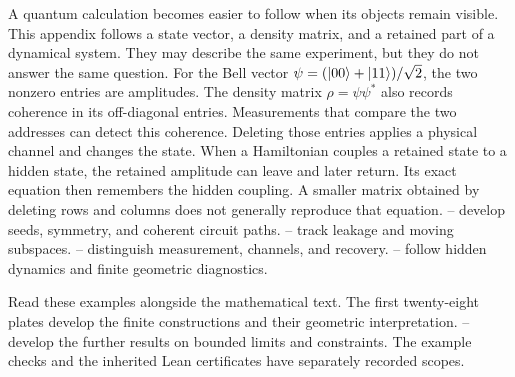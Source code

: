 \begingroup

\fontsize{10.5}{12.6}\selectfont
\setlength{\parskip}{4pt}
\setlength{\abovedisplayskip}{6pt}\setlength{\belowdisplayskip}{6pt}
A quantum calculation becomes easier to follow when its objects remain visible. This appendix follows a state vector, a density matrix, and a retained part of a dynamical system. They may describe the same experiment, but they do not answer the same question.
For the Bell vector $\psi=(\left|00\right\rangle+\left|11\right\rangle)/\sqrt2$, the two nonzero entries are amplitudes. The density matrix $\rho=\psi\psi^*$ also records coherence in its off-diagonal entries. Measurements that compare the two addresses can detect this coherence. Deleting those entries applies a physical channel and changes the state.
When a Hamiltonian couples a retained state to a hidden state, the retained amplitude can leave and later return. Its exact equation then remembers the hidden coupling. A smaller matrix obtained by deleting rows and columns does not generally reproduce that equation.
-- develop seeds, symmetry, and coherent circuit paths. -- track leakage and moving subspaces. -- distinguish measurement, channels, and recovery. -- follow hidden dynamics and finite geometric diagnostics.

Read these examples alongside the mathematical text. The first twenty-eight plates develop the finite constructions and their geometric interpretation. -- develop the further results on bounded limits and constraints. The example checks and the inherited Lean certificates have separately recorded scopes.

